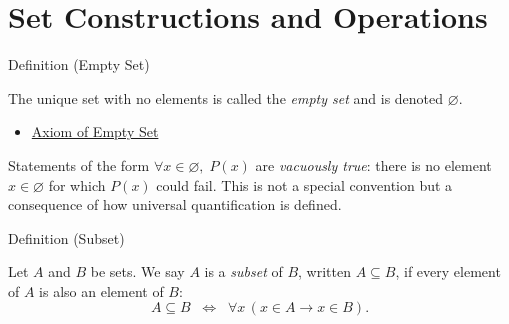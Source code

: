 
\section{Set Constructions and Operations}


\begin{definitionbox}{Definition (Empty Set)}
\begin{definition}\label{def:empty-set}
The unique set with no elements is called the \emph{empty set} and is denoted
$\varnothing$.
\end{definition}
\end{definitionbox}

\begin{dependencies}
\begin{itemize}
  \item \hyperref[ax:empty-set]{Axiom of Empty Set}
\end{itemize}
\end{dependencies}

\begin{remark*}
Statements of the form $\forall x \in \varnothing,\; P(x)$ are
\emph{vacuously true}: there is no element $x \in \varnothing$ for which
$P(x)$ could fail. This is not a special convention but a consequence of
how universal quantification is defined.
\end{remark*}

\begin{definitionbox}{Definition (Subset)}
\begin{definition}[Subset]\label{def:subset}
Let $A$ and $B$ be sets. We say $A$ is a \emph{subset} of $B$, written
$A \subseteq B$, if every element of $A$ is also an element of $B$:
\[
A \subseteq B \;\;\Longleftrightarrow\;\; \forall x \, (x \in A \rightarrow x \in B).
\]
\end{definition}
\end{definitionbox}

